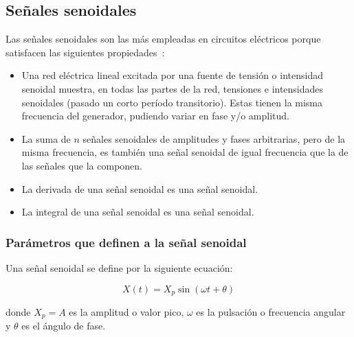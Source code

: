 \documentclass{article}
\begin{document}
    \subsection{Señales senoidales}

    Las señales senoidales son las más empleadas en circuitos eléctricos porque satisfacen las siguientes propiedades~\cite{alexander2018fundamentos}:

    \begin{itemize}
        \item Una red eléctrica lineal excitada por una fuente de tensión o intensidad senoidal muestra, en todas las partes de la red, tensiones e intensidades senoidales (pasado un corto período transitorio). Estas tienen la misma frecuencia del generador, pudiendo variar en fase y/o amplitud.
        \item La suma de $n$ señales senoidales de amplitudes y fases arbitrarias, pero de la misma frecuencia, es también una señal senoidal de igual frecuencia que la de las señales que la componen.
        \item La derivada de una señal senoidal es una señal senoidal.
        \item La integral de una señal senoidal es una señal senoidal.
    \end{itemize}

    \subsubsection{Parámetros que definen a la señal senoidal}

    Una señal senoidal se define por la siguiente ecuación:

    \begin{equation}
        X(t) = X_p \sin(\omega t + \theta)\label{eq:senoide}
    \end{equation}

    donde $X_p = A$ es la amplitud o valor pico, $\omega$ es la pulsación o frecuencia angular y $\theta$ es el ángulo de fase.
\end{document}
